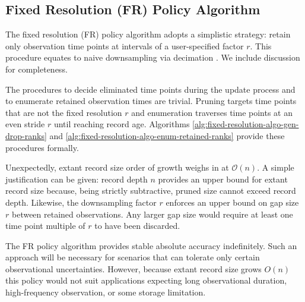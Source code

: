 \subsection{Fixed Resolution (FR) Policy Algorithm}
\label{sec:fixed-resolution-algo}

The fixed resolution (FR) policy algorithm adopts a simplistic strategy: retain only observation time points at intervals of a user-specified factor $r$.
This procedure equates to naive downsampling via decimation \citep[p. 31]{crochiere1983multirate}.
We include discussion for completeness.

The procedures to decide eliminated time points during the update process and to enumerate retained observation times are trivial.
Pruning targets time points that are not the fixed resolution $r$ and enumeration traverses time points at an even stride $r$ until reaching record age.
Algorithms \ref{alg:fixed-resolution-algo-gen-drop-ranks} and \ref{alg:fixed-resolution-algo-enum-retained-ranks} provide these procedures formally.

Unexpectedly, extant record size order of growth weighs in at $\mathcal{O}(n)$.
A simple justification can be given: record depth $n$ provides an upper bound for extant record size because, being strictly subtractive, pruned size cannot exceed record depth.
Likewise, the downsampling factor $r$ enforces an upper bound on gap size $r$ between retained observations.
Any larger gap size would require at least one time point multiple of $r$ to have been discarded.
% 
% 

The FR policy algorithm provides stable absolute accuracy indefinitely.
Such an approach will be necessary for scenarios that can tolerate only certain observational uncertainties.
However, because extant record size grows $O(n)$ this policy would not suit applications expecting long observational duration, high-frequency observation, or some storage limitation.



